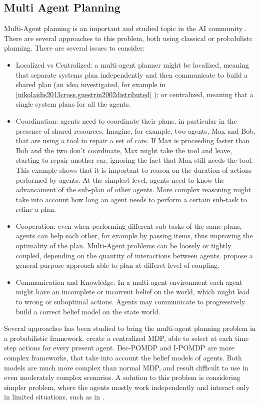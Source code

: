 \subsection{Multi Agent Planning}
Multi-Agent planning   is an important and studied topic in the AI community \cite{durfee1999survey}. There are several approaches to this problem, both using classical or probabilistc planning. There are several issues to consider:
\begin{itemize}
\item Localized vs Centralized: a multi-agent planner might be localized, meaning that separate systems plan independently and then communicate to build a shared plan (an idea investigated, for example in \ref{nikolaidis2013cross,guestrin2002distributed} ); or centralized, meaning that a single system plans for all the agents.
\item Coordination: agents need to coordinate their plans, in particular in the presence of shared resources. Imagine, for example, two agents, Max and Bob, that are using a tool to repair a set of cars. If Max is proceeding faster than Bob and the two don't coordinate, Max might take the tool and leave, starting to repair another car, ignoring the fact that Max still needs the tool. This example shows that it is important to reason on the duration of actions performed by agents. At the simplest level, agents need to know the advancament of the sub-plan of other agents. More complex reasoning might take into account how long an agent needs to perform a certain sub-task to refine a plan. 
\item Cooperation: even when performing different sub-tasks of the same plans, agents can help each other, for example by passing items, thus improving the optimality of the plan. Multi-Agent problems can be loosely or tightly coupled, depending on the quantity of interactions between agents. \cite{torreno2015approach} propose a general purpose approach able to plan at differet level of coupling.
\item Communication and Knowledge. In a multi-agent environment each agent might have an incomplete or incorrent belief on the world, which might lead to wrong or suboptimal actions. Agents may communicate to progressively build a correct belief model on the state world. 
\end{itemize}


Several approaches has been studied to bring the multi-agent planning problem in a probabilistic framework. \cite{boutilier1999sequential} create a centralized MDP, able to select at each time step actions for every present agent. Dec-POMDP \cite{bernstein2002complexity} and I-POMDP \cite{gmytrasiewicz2005framework} are more complex frameworks, that take into account the belief models of agents. Both models are much more complex than normal MDP\POMDPs, and result difficult to use in even moderately complex scenarios. A solution to this problem is considering simpler problem, where the agents mostly work independently and interact only in limited situations, such as in \cite{molo2013heuristic}. 

